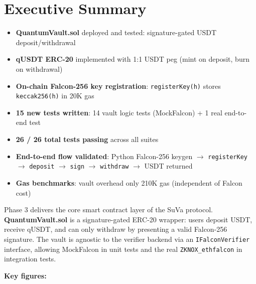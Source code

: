 \documentclass[11pt,a4paper]{article}
\begin{document}
\tableofcontents
\newpage

\section{Executive Summary}

\begin{resultbox}
\begin{itemize}
  \item[$\checkmark$] \textbf{QuantumVault.sol} deployed and tested: signature-gated USDT deposit/withdrawal
  \item[$\checkmark$] \textbf{qUSDT ERC-20} implemented with 1:1 USDT peg (mint on deposit, burn on withdrawal)
  \item[$\checkmark$] \textbf{On-chain Falcon-256 key registration}: \texttt{registerKey(h)} stores \texttt{keccak256(h)} in 20K gas
  \item[$\checkmark$] \textbf{15 new tests written}: 14 vault logic tests (MockFalcon) + 1 real end-to-end test
  \item[$\checkmark$] \textbf{26 / 26 total tests passing} across all suites
  \item[$\checkmark$] \textbf{End-to-end flow validated}: Python Falcon-256 keygen $\to$ \texttt{registerKey} $\to$ \texttt{deposit} $\to$ \texttt{sign} $\to$ \texttt{withdraw} $\to$ USDT returned
  \item[$\checkmark$] \textbf{Gas benchmarks}: vault overhead only 210K gas (independent of Falcon cost)
\end{itemize}
\end{resultbox}

\vspace{0.5cm}

Phase 3 delivers the core smart contract layer of the SuVa protocol. \textbf{QuantumVault.sol} is a signature-gated ERC-20 wrapper: users deposit USDT, receive qUSDT, and can only withdraw by presenting a valid Falcon-256 signature. The vault is agnostic to the verifier backend via an \texttt{IFalconVerifier} interface, allowing MockFalcon in unit tests and the real \texttt{ZKNOX\_ethfalcon} in integration tests.

\vspace{0.4cm}

\textbf{Key figures:}
\end{document}
